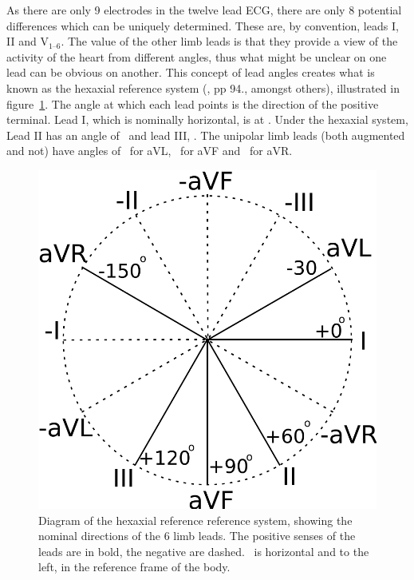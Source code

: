 As there are only 9 electrodes in the twelve lead ECG, there are only 8
potential differences which can be uniquely determined.
These are, by convention, leads I, II and $\text{V}_{\text{1--6}}$.
The value of the other limb leads is that they provide a view of the activity of
the heart from different angles, thus what might be unclear on one lead can be
obvious on another.
This concept of lead angles creates what is known as the hexaxial reference
system (\cite{Lipman1994}, pp 94., amongst others), illustrated in
figure~\ref{fig:intro:ecg:hex}.
The angle at which each lead points is the direction of the positive terminal.
Lead I, which is nominally horizontal, is at .
Under the hexaxial system, Lead II has an angle of \ and lead III,
.
The unipolar limb leads (both augmented and not) have angles of \ for
aVL, \ for aVF and \ for aVR.

\begin{figure}
\begin{center}
\includegraphics{figures/intro/hexaxial}
\end{center}
\caption[Hexaxial Reference System]{
\label{fig:intro:ecg:hex}
Diagram of the hexaxial reference reference system, showing the nominal
directions of the 6 limb leads.
The positive senses of the leads are in bold, the negative are dashed.
\ is horizontal and to the left, in the reference frame of the body.
}
\end{figure}

